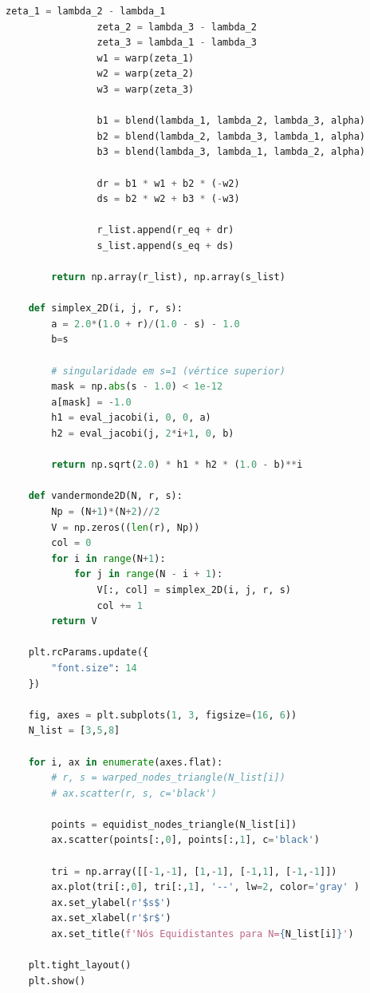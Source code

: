 \begin{anexosenv}
\begin{lstlisting}[language=Python, breaklines=true, basicstyle=\tiny]
                zeta_1 = lambda_2 - lambda_1 
                zeta_2 = lambda_3 - lambda_2 
                zeta_3 = lambda_1 - lambda_3 
                w1 = warp(zeta_1)
                w2 = warp(zeta_2)
                w3 = warp(zeta_3)
                
                b1 = blend(lambda_1, lambda_2, lambda_3, alpha)
                b2 = blend(lambda_2, lambda_3, lambda_1, alpha)
                b3 = blend(lambda_3, lambda_1, lambda_2, alpha)

                dr = b1 * w1 + b2 * (-w2)
                ds = b2 * w2 + b3 * (-w3)
                
                r_list.append(r_eq + dr)
                s_list.append(s_eq + ds)

        return np.array(r_list), np.array(s_list)

    def simplex_2D(i, j, r, s):
        a = 2.0*(1.0 + r)/(1.0 - s) - 1.0
        b=s
        
        # singularidade em s=1 (vértice superior)
        mask = np.abs(s - 1.0) < 1e-12
        a[mask] = -1.0
        h1 = eval_jacobi(i, 0, 0, a)
        h2 = eval_jacobi(j, 2*i+1, 0, b)
        
        return np.sqrt(2.0) * h1 * h2 * (1.0 - b)**i

    def vandermonde2D(N, r, s):
        Np = (N+1)*(N+2)//2
        V = np.zeros((len(r), Np))
        col = 0
        for i in range(N+1):
            for j in range(N - i + 1):
                V[:, col] = simplex_2D(i, j, r, s)
                col += 1
        return V

    plt.rcParams.update({
        "font.size": 14
    })

    fig, axes = plt.subplots(1, 3, figsize=(16, 6))
    N_list = [3,5,8]

    for i, ax in enumerate(axes.flat):
        # r, s = warped_nodes_triangle(N_list[i])
        # ax.scatter(r, s, c='black')
        
        points = equidist_nodes_triangle(N_list[i])
        ax.scatter(points[:,0], points[:,1], c='black')
        
        tri = np.array([[-1,-1], [1,-1], [-1,1], [-1,-1]])
        ax.plot(tri[:,0], tri[:,1], '--', lw=2, color='gray' )
        ax.set_ylabel(r'$s$')
        ax.set_xlabel(r'$r$')
        ax.set_title(f'Nós Equidistantes para N={N_list[i]}')

    plt.tight_layout()
    plt.show()
    \end{lstlisting}


\end{anexosenv}
